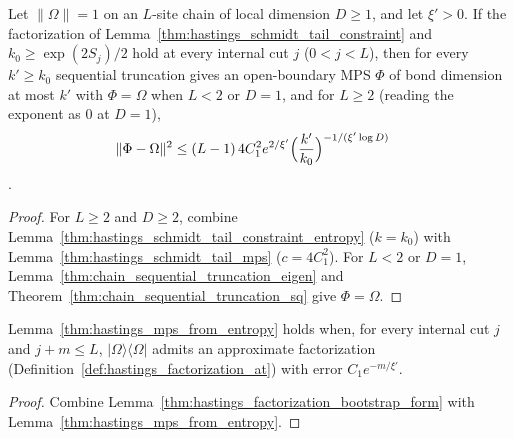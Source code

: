 \begin{lemma}
    \label{thm:hastings_mps_from_entropy}
    \leanok
    Let $\|\Omega\|=1$ on an $L$-site chain of local dimension $D\ge1$, and let
    $\xi'>0$. If the factorization of
    Lemma~\ref{thm:hastings_schmidt_tail_constraint} and
    $k_0\ge\exp(2S_j)/2$ hold at every internal cut $j$ ($0<j<L$), then for
    every $k'\ge k_0$ sequential truncation gives an open-boundary MPS $\Phi$ of
    bond dimension at most $k'$ with $\Phi=\Omega$ when $L<2$ or $D=1$, and for
    $L\ge2$ (reading the exponent as $0$ at $D=1$),
    \begin{align}
        \lVert\Phi-\Omega\rVert^2
         & \le(L-1)\,4C_1^2e^{2/\xi'}\Bigl(\frac{k'}{k_0}\Bigr)^{-1/(\xi'\log D)}
        \label{eq:hastings_mps_from_entropy}
    \end{align}
    \cite{gap:hastings07_mps_entropy_stage,gap:hastings07_mps_error_measure,
        gap:hastings07_schmidt_tail_constant}.
\end{lemma}
\begin{proof}\leanok
    For $L\ge2$ and $D\ge2$, combine
    Lemma~\ref{thm:hastings_schmidt_tail_constraint_entropy} ($k=k_0$) with
    Lemma~\ref{thm:hastings_schmidt_tail_mps} ($c=4C_1^2$). For $L<2$ or
    $D=1$, Lemma~\ref{thm:chain_sequential_truncation_eigen}
    and Theorem~\ref{thm:chain_sequential_truncation_sq} give $\Phi=\Omega$.
\end{proof}

\begin{lemma}
    \label{thm:hastings_mps_from_entropy_lemma1}
    \leanok
    Lemma~\ref{thm:hastings_mps_from_entropy} holds when, for every internal
    cut $j$ and $j+m\le L$, $|\Omega\rangle\langle\Omega|$ admits an
    approximate factorization (Definition~\ref{def:hastings_factorization_at})
    with error $C_1e^{-m/\xi'}$.
\end{lemma}
\begin{proof}\leanok
    Combine Lemma~\ref{thm:hastings_factorization_bootstrap_form} with
    Lemma~\ref{thm:hastings_mps_from_entropy}.
\end{proof}

